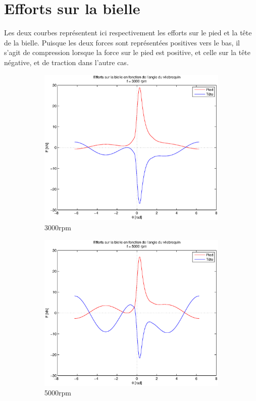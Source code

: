 \documentclass{article}
\begin{document}
\section{Efforts sur la bielle}

Les deux courbes représentent ici respectivement les efforts sur le pied et la tête de la bielle. Puisque les deux forces sont représentées positives vers le bas, il s'agit de compression lorsque la force sur le pied est positive, et celle sur la tête négative, et de traction dans l'autre cas. 

\begin{figure}[h]
\centering
    \begin{subfigure}[b]{0.45\textwidth}
    				\includegraphics[scale=0.4]{Schema/forces_3000rpm.eps}
                \caption{\unit{3000}{rpm}}
                \label{fig:forces_3000rpm}
    \end{subfigure}
    \begin{subfigure}[b]{0.45\textwidth}
        			\includegraphics[scale=0.4]{Schema/forces_5000rpm.eps}
                \caption{\unit{5000}{rpm}}
                \label{fig:forces_5000rpm}
    \end{subfigure}
    \caption{}
\end{figure}
\end{document}
